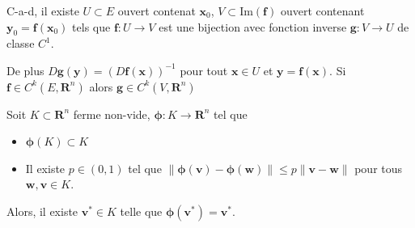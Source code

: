 
C-a-d, il existe $U\subset E$ ouvert contenat $\boldsymbol{x}_{0}$, $V\subset \mathrm{Im}(\boldsymbol{f})$ ouvert contenant $\boldsymbol{y}_{0}=\boldsymbol{f}(\boldsymbol{x}_{0})$ tels que $\boldsymbol{f}:U\to V$ est une bijection avec fonction inverse $\boldsymbol{g}:V\to U$ de classe $C^{1}$.

De plus $D\boldsymbol{g}(\boldsymbol{y})=(D\boldsymbol{f}(\boldsymbol{x}))^{-1}$ pour tout $\boldsymbol{x}\in U$ et $\boldsymbol{y}=\boldsymbol{f}(\boldsymbol{x})$. Si $\boldsymbol{f}\in C^{k}(E,\mathbf{R}^{n})$ alors $\boldsymbol{g}\in C^{k}(V,\mathbf{R}^{n})$

\begin{theorem}
Soit $K\subset \mathbf{R}^{n}$ ferme non-vide, $\boldsymbol{\phi}:K\to \mathbf{R}^{n}$ tel que 
\begin{itemize}
\item $\boldsymbol{\phi}(K)\subset K$
\item Il existe $p \in(0,1)$ tel que $\lVert \boldsymbol{\phi}(\boldsymbol{v})-\boldsymbol{\phi}(\boldsymbol{w}) \rVert\le p\lVert \boldsymbol{v}-\boldsymbol{w} \rVert$ pour tous $\boldsymbol{w},\boldsymbol{v}\in K$.
\end{itemize}
Alors, il existe $\boldsymbol{v}^{*}\in K$ telle que $\boldsymbol{\phi}(\boldsymbol{v}^{*})=\boldsymbol{v}^{*}$.
\end{theorem}
